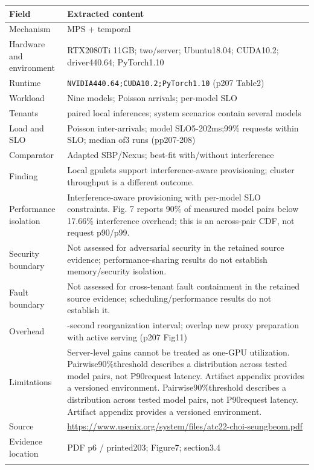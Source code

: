 \begin{longtable}{>{\raggedright\arraybackslash}p{}>{\raggedright\arraybackslash}p{}}
\toprule
\textbf{Field} & \textbf{Extracted content}\\\midrule\endhead
Mechanism & MPS + temporal\\\addlinespace
Hardware and environment & RTX2080Ti 11GB; two/server; Ubuntu18.04; CUDA10.2; driver440.64; PyTorch1.10\\\addlinespace
Runtime & \nolinkurl{NVIDIA440.64;CUDA10.2;PyTorch1.10} (p207 Table2)\\\addlinespace
Workload & Nine models; Poisson arrivals; per-model SLO\\\addlinespace
Tenants & paired local inferences; system scenarios contain several models\\\addlinespace
Load and SLO & Poisson inter-arrivals; model SLO5-202ms;99\% requests within SLO; median of3 runs (pp207-208)\\\addlinespace
Comparator & Adapted SBP/Nexus; best-fit with/without interference\\\addlinespace
Finding & Local gpulets support interference-aware provisioning; cluster throughput is a different outcome.\\\addlinespace
Performance isolation & Interference-aware provisioning with per-model SLO constraints. Fig. 7 reports 90\% of measured model pairs below 17.66\% interference overhead; this is an across-pair CDF, not request p90/p99.\\\addlinespace
Security boundary & Not assessed for adversarial security in the retained source evidence; performance-sharing results do not establish memory/security isolation.\\\addlinespace
Fault boundary & Not assessed for cross-tenant fault containment in the retained source evidence; scheduling/performance results do not establish it.\\\addlinespace
Overhead & 20-second reorganization interval; overlap new proxy preparation with active serving (p207 Fig11)\\\addlinespace
Limitations & Server-level gains cannot be treated as one-GPU utilization. Pairwise90\%threshold describes a distribution across tested model pairs, not P90request latency. Artifact appendix provides a versioned environment. Pairwise90\%threshold describes a distribution across tested model pairs, not P90request latency. Artifact appendix provides a versioned environment.\\\addlinespace
Source & \url{https://www.usenix.org/system/files/atc22-choi-seungbeom.pdf}\\\addlinespace
Evidence location & PDF p6 / printed203; Figure7; section3.4\\\addlinespace
\bottomrule\end{longtable}

